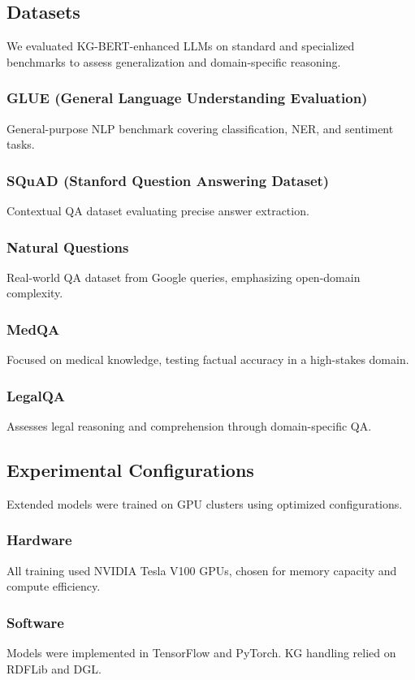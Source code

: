 \documentclass[conference]{IEEEtran}
\begin{document}
\subsection{Datasets}
We evaluated KG-BERT-enhanced LLMs on standard and specialized benchmarks to assess generalization and domain-specific reasoning.

\subsubsection{GLUE (General Language Understanding Evaluation)~\cite{wang2018glue}} General-purpose NLP benchmark covering classification, NER, and sentiment tasks.
\subsubsection{SQuAD (Stanford Question Answering Dataset)~\cite{rajpurkar2016squad}} Contextual QA dataset evaluating precise answer extraction.
\subsubsection{Natural Questions~\cite{kwiatkowski2019natural}} Real-world QA dataset from Google queries, emphasizing open-domain complexity.
\subsubsection{MedQA~\cite{jin2020medqa}} Focused on medical knowledge, testing factual accuracy in a high-stakes domain.
\subsubsection{LegalQA~\cite{zhang2020legalbert}} Assesses legal reasoning and comprehension through domain-specific QA.

\subsection{Experimental Configurations}
Extended models were trained on GPU clusters using optimized configurations.

\subsubsection{Hardware} All training used NVIDIA Tesla V100 GPUs, chosen for memory capacity and compute efficiency.
\subsubsection{Software} Models were implemented in TensorFlow and PyTorch. KG handling relied on RDFLib and DGL.
\end{document}

